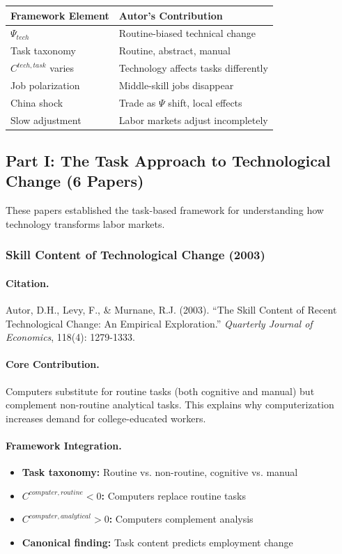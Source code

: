 \begin{center}
\renewcommand{\arraystretch}{1.2}
\small
\begin{tabular}{ll}
\hline
\textbf{Framework Element} & \textbf{Autor's Contribution} \\
\hline
$\Psi_{tech}$ & Routine-biased technical change \\
Task taxonomy & Routine, abstract, manual \\
$C^{tech,task}$ varies & Technology affects tasks differently \\
Job polarization & Middle-skill jobs disappear \\
China shock & Trade as $\Psi$ shift, local effects \\
Slow adjustment & Labor markets adjust incompletely \\
\hline
\end{tabular}
\end{center}

\subsection{Part I: The Task Approach to Technological Change (6 Papers)}

These papers established the task-based framework for understanding how
technology transforms labor markets.

\subsubsection{Skill Content of Technological Change (2003)}

\paragraph{Citation.}
Autor, D.H., Levy, F., \& Murnane, R.J. (2003). ``The Skill Content of Recent
Technological Change: An Empirical Exploration.''
\emph{Quarterly Journal of Economics}, 118(4): 1279-1333.

\paragraph{Core Contribution.}
Computers substitute for routine tasks (both cognitive and manual) but
complement non-routine analytical tasks. This explains why computerization
increases demand for college-educated workers.

\paragraph{Framework Integration.}
\begin{itemize}
  \item \textbf{Task taxonomy:} Routine vs. non-routine, cognitive vs. manual
  \item \textbf{$C^{computer,routine} < 0$:} Computers replace routine tasks
  \item \textbf{$C^{computer,analytical} > 0$:} Computers complement analysis
  \item \textbf{Canonical finding:} Task content predicts employment change
\end{itemize}

